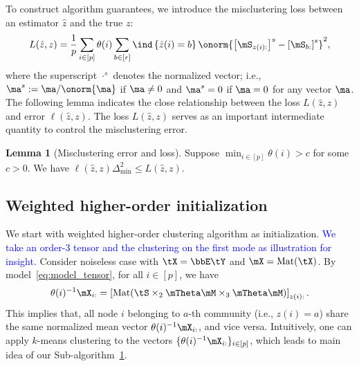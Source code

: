 \documentclass[lettersize,onecolumn,journal]{IEEEtran}
\theoremstyle{definition}
\newtheorem{lem}{Lemma}
\theoremstyle{definition}
\newcommand{\off}[1]{\left[#1\right]}
\newcommand{\offf}[1]{\left\{#1\right\}}
\def\fixme#1#2{\textbf{\color{red}[FIXME (#1): #2]}}
\begin{document}
{
\color{blue}

To construct algorithm guarantees,  we introduce the misclustering loss between an estimator $\hat z$ and the true $z$:
\begin{equation}\label{eq:defnofL}
    L(\hat z, z) = \frac{1}{p}  \sum_{i \in [p]} \theta(i) \sum_{b \in [r]}  \ind \offf{ \hat z(i) = b } \onorm{ \off{ \mS_{ z(i):}  }^s - \off{ \mS_{b:}  }^s  }^2,
\end{equation}
where the superscript $\cdot^{s}$ denotes the normalized vector; i.e., $\ma^s:=\ma/\onorm{\ma}$ if $\ma\neq 0$ and $\ma^{s}=0$ if $\ma=0$ for any vector $\ma$. The following lemma indicates the close relationship between the loss $L(\hat z, z)$ and error $\ell(\hat z, z)$. The loss $L(\hat z, z)$ serves as an important intermediate quantity to control the misclustering error.

\begin{lem}[Misclustering error and loss]\label{lem:mis}Suppose $\min_{i \in [p]}\theta(i) > c$ for some $c > 0$. We have $\ell(\hat z, z) \Delta_{\min}^2 \leq L(\hat z, z)$.
\end{lem}

}

\subsection{Weighted higher-order initialization}

We start with weighted higher-order clustering algorithm as initialization. \textcolor{blue}{We take an order-3 tensor and the clustering on the first mode as illustration for insight.} Consider noiseless case with $\tX = \bbE\tY$ and $\mX = \text{Mat}(\tX)$. 
By model~\eqref{eq:model_tensor}, for all $i \in [p]$, we have
\begin{equation}\label{eq:kmeans}
    \theta(i)^{-1} \mX_{i:} = \off{\text{Mat}( \tS \times_2 \mTheta \mM \times_3  \mTheta \mM )}_{z(i):}. 
\end{equation}
This implies that, all node $i$ belonging to $a$-th community (i.e., $z(i)=a$) share the same normalized mean vector $\theta(i)^{-1} \mX_{i:}$, and vice versa. Intuitively, one can apply $k$-means clustering to the vectors $\{ \theta(i)^{-1} \mX_{i:} \}_{i\in[p]}$, which leads to main idea of our Sub-algorithm~\hyperref[alg:main]{1}.  
\end{document}

